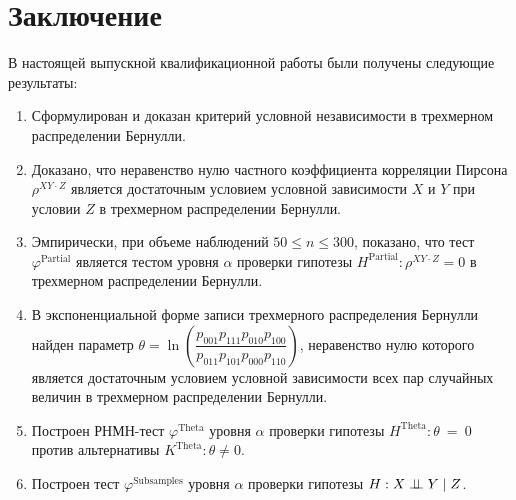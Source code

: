 \section*{Заключение}
В настоящей выпускной квалификационной работы 
были получены следующие результаты:
\begin{enumerate}
    \item Сформулирован и доказан критерий условной независимости
    в трехмерном распределении Бернулли.
    \item Доказано, что неравенство нулю
    частного коэффициента корреляции Пирсона 
    $\rho^{XY \cdot Z}$ является достаточным
    условием условной зависимости $X$ и $Y$ при 
    условии $Z$ в трехмерном распределении Бернулли.
    \item Эмпирически, при объеме наблюдений $50 \leq n \leq 300$,
    показано, что тест
    $\varphi^{\text{Partial}}$ является тестом уровня
    $\alpha$ проверки гипотезы $H^{\text{Partial}}: \rho^{XY\cdot Z}=0$ в трехмерном распределении
    Бернулли.
    \item В экспоненциальной форме записи трехмерного 
    распределения Бернулли найден параметр 
    $\theta = \ln  \left(\dfrac{p_{001}p_{111}p_{010}p_{100}}{p_{011}p_{101}p_{000}p_{110}}\right)$,
    неравенство нулю которого является достаточным 
    условием условной зависимости всех пар
    случайных величин в трехмерном распределении Бернулли.
    \item Построен РНМН-тест $\varphi^{\text{Theta}}$
    уровня $\alpha$ проверки гипотезы $H^{\text{Theta}}: \theta~=~0$
    против альтернативы $K^{\text{Theta}}: \theta\neq 0$.
    \item Построен тест $\varphi^{\text{Subsamples}}$ 
    уровня $\alpha$
    проверки гипотезы $H: X \perp\!\!\!\perp Y \mid Z$.
\end{enumerate}
